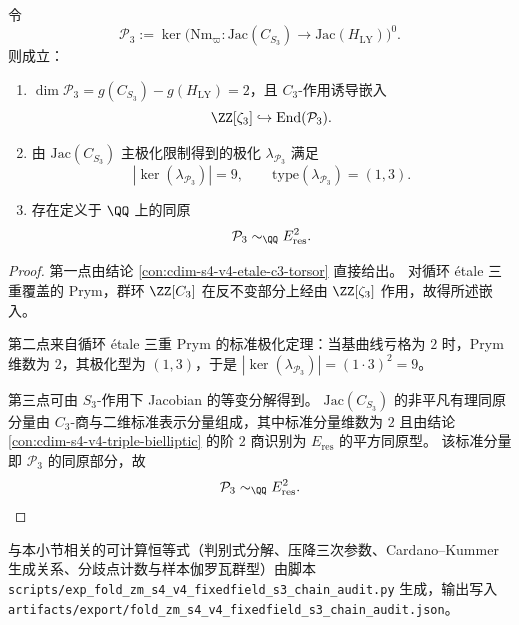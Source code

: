 \begin{conclusion}\label{con:cdim-s4-v4-prym-13-polarization}
令
\[
\mathcal P_{3}
:=
\ker\!\bigl(\mathrm{Nm}_{\varpi}:\mathrm{Jac}(C_{S_3})\to \mathrm{Jac}(H_{\mathrm{LY}})\bigr)^0.
\]
则成立：
\begin{enumerate}
  \item \(\dim \mathcal P_{3}=g(C_{S_3})-g(H_{\mathrm{LY}})=2\)，且 \(C_3\)-作用诱导嵌入
  \[
  \ZZ[\zeta_3]\hookrightarrow \mathrm{End}(\mathcal P_{3}).
  \]
  \item 由 \(\mathrm{Jac}(C_{S_3})\) 主极化限制得到的极化 \(\lambda_{\mathcal P_3}\) 满足
  \[
  |\ker(\lambda_{\mathcal P_3})|=9,\qquad
  \mathrm{type}(\lambda_{\mathcal P_3})=(1,3).
  \]
  \item 存在定义于 \(\QQ\) 上的同原
  \[
  \mathcal P_{3}\sim_{\QQ}E_{\mathrm{res}}^{2}.
  \]
\end{enumerate}
\end{conclusion}
\begin{proof}
第一点由结论 \ref{con:cdim-s4-v4-etale-c3-torsor} 直接给出。
对循环 étale 三重覆盖的 Prym，群环 \(\ZZ[C_3]\) 在反不变部分上经由
\(
\ZZ[\zeta_3]
\)
作用，故得所述嵌入。

第二点来自循环 étale 三重 Prym 的标准极化定理：当基曲线亏格为 \(2\) 时，Prym 维数为 \(2\)，其极化型为 \((1,3)\)，于是
\(
|\ker(\lambda_{\mathcal P_3})|=(1\cdot 3)^2=9
\)。

第三点可由 \(S_3\)-作用下 Jacobian 的等变分解得到。
\(\mathrm{Jac}(C_{S_3})\) 的非平凡有理同原分量由 \(C_3\)-商与二维标准表示分量组成，其中标准分量维数为 \(2\) 且由结论 \ref{con:cdim-s4-v4-triple-bielliptic} 的阶 \(2\) 商识别为 \(E_{\mathrm{res}}\) 的平方同原型。
该标准分量即 \(\mathcal P_3\) 的同原部分，故
\[
\mathcal P_3\sim_{\QQ}E_{\mathrm{res}}^2.
\]
\end{proof}

\begin{remark}[代数审计输出]\label{rem:cdim-s4-v4-resolvent-prym-audit-script}
与本小节相关的可计算恒等式（判别式分解、压降三次参数、Cardano--Kummer 生成关系、分歧点计数与样本伽罗瓦群型）由脚本
\texttt{scripts/exp\_fold\_zm\_s4\_v4\_fixedfield\_s3\_chain\_audit.py}
生成，输出写入
\texttt{artifacts/export/fold\_zm\_s4\_v4\_fixedfield\_s3\_chain\_audit.json}。
\end{remark}


